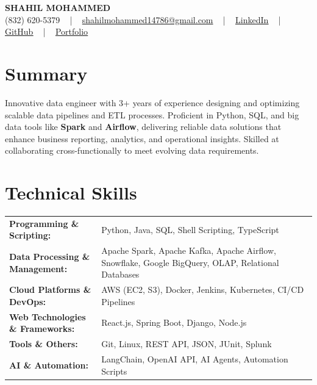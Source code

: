 \documentclass[letterpaper,11pt]{article}
\begin{document}
\begin{center}
    {\fontsize{14pt}{12pt}\selectfont \textbf{\MakeUppercase{Shahil Mohammed}}}\\ \vspace{2pt}
    \fontsize{10pt}{12pt}\selectfont (832) 620-5379 ~ | ~ \href{mailto:shahilmohammed14786@gmail.com}{shahilmohammed14786@gmail.com} ~ | ~  
    \href{https://www.linkedin.com/in/shahil-mohammed-9652931a1/}{\color{blue}\underline{LinkedIn}}  ~ | ~ 
    \href{https://github.com/freakbeast14}{\color{blue}\underline{GitHub}} ~ | ~ 
    \href{https://shahil-mohammed.netlify.app/}{\color{blue}\underline{Portfolio}}
    \vspace{-8pt}
\end{center}

\section{Summary}
\fontsize{9pt}{10pt}\selectfont
Innovative data engineer with 3+ years of experience designing and optimizing scalable data pipelines and ETL processes. Proficient in Python, SQL, and big data tools like \textbf{Spark} and \textbf{Airflow}, delivering reliable data solutions that enhance business reporting, analytics, and operational insights. Skilled at collaborating cross-functionally to meet evolving data requirements.
 \vspace{-5pt}
 
\section{Technical Skills}
        \vspace{-14pt}
        \begin{table}[h]
            \fontsize{9pt}{10pt}\selectfont
            \begin{tabular}{p{0.3\linewidth} p{0.7\linewidth}}
                \textbf{Programming \& Scripting:} & Python, Java, SQL, Shell Scripting, TypeScript \\
                \textbf{Data Processing \& Management:} & Apache Spark, Apache Kafka, Apache Airflow, Snowflake, Google BigQuery, OLAP, Relational Databases \\
                \textbf{Cloud Platforms \& DevOps:} & AWS (EC2, S3), Docker, Jenkins, Kubernetes, CI/CD Pipelines \\
                \textbf{Web Technologies \& Frameworks:} & React.js, Spring Boot, Django, Node.js \\
                \textbf{Tools \& Others:} & Git, Linux, REST API, JSON, JUnit, Splunk \\
                \textbf{AI \& Automation:} & LangChain, OpenAI API, AI Agents, Automation Scripts \\
            \end{tabular}
        \end{table}
 \vspace{-15pt}
 
\end{document}
